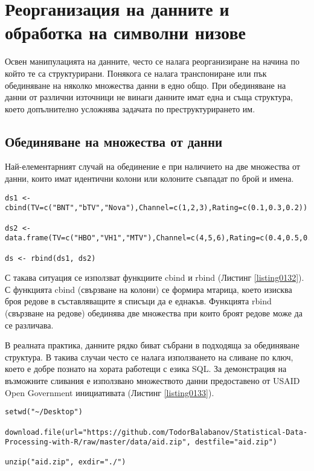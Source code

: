 \newpage
\chapter{Реорганизация на данните и обработка на символни низове}
\label{chapter07}

Освен манипулацията на данните, често се налага реорганизиране на начина по който те са структурирани. Понякога се налага транспониране или пък обединяване на няколко множества данни в едно общо. При обединяване на данни от различни източници не винаги данните имат една и съща структура, което допълнително усложнява задачата по преструктурирането им. 

\section{Обединяване на множества от данни}

Най-елементарният случай на обединение е при наличието на две множества от данни, които имат идентични колони или колоните съвпадат по брой и имена.

\begin{lstlisting}[caption=Обединяване на множества от данни, label=listing0132]
ds1 <- cbind(TV=c("BNT","bTV","Nova"),Channel=c(1,2,3),Rating=c(0.1,0.3,0.2))

ds2 <- data.frame(TV=c("HBO","VH1","MTV"),Channel=c(4,5,6),Rating=c(0.4,0.5,0.6),stringsAsFactors=FALSE)

ds <- rbind(ds1, ds2)
\end{lstlisting}

С такава ситуация се използват функциите cbind и rbind (Листинг \ref{listing0132}). С функцията cbind (свързване на колони) се формира мтарица, което изисква броя редове в съставляващите я списъци да е еднакъв. Функцията rbind (свързване на редове) обединява две множества при които броят редове може да се различава. 

В реалната практика, данните рядко биват събрани в подходяща за обединяване структура. В такива случаи често се налага използването на сливане по ключ, което е добре познато на хората работещи с езика SQL. За демонстрация на възможните сливания е използвано множеството данни предоставено от USAID Open Government инициативата (Листинг \ref{listing0133}). 

\begin{lstlisting}[caption=USAID множество от данни, label=listing0133]
setwd("~/Desktop")

download.file(url="https://github.com/TodorBalabanov/Statistical-Data-Processing-with-R/raw/master/data/aid.zip", destfile="aid.zip")

unzip("aid.zip", exdir="./")
\end{lstlisting}

